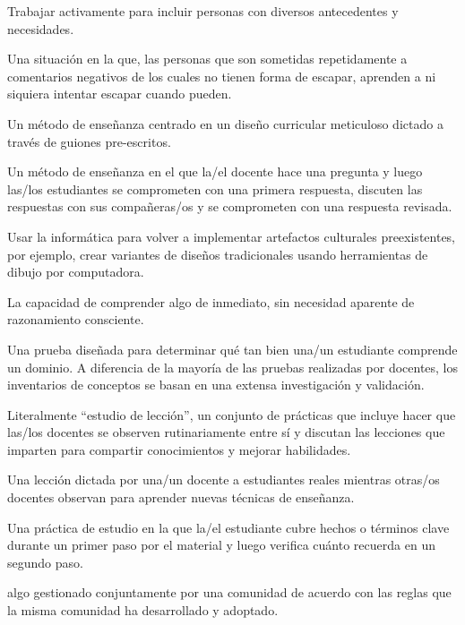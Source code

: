 \begin{description}
 Trabajar activamente para incluir
personas con diversos antecedentes y necesidades.

 Una situación en la que, las personas que son sometidas repetidamente a 
comentarios negativos de los cuales no tienen forma de escapar, aprenden a ni siquiera intentar escapar cuando pueden.

 Un método de enseñanza centrado
en un diseño curricular meticuloso dictado a través de guiones pre-escritos.

 Un método de enseñanza en el que la/el docente hace una pregunta y 
luego las/los estudiantes se comprometen con una primera respuesta, discuten las respuestas con sus compañeras/os y 
se comprometen con una respuesta revisada.

 Usar la informática
para volver a implementar artefactos culturales preexistentes, por ejemplo,
crear variantes de diseños tradicionales usando herramientas de dibujo por computadora.

 La capacidad de comprender algo de inmediato,
sin necesidad aparente de razonamiento consciente.

 Una prueba diseñada para determinar
qué tan bien una/un estudiante comprende un dominio. A diferencia de la mayoría de las pruebas realizadas por docentes,
los inventarios de conceptos se basan en una extensa investigación y validación.

 Literalmente ``estudio de lección'', un conjunto de prácticas que incluye hacer que 
las/los docentes se observen rutinariamente entre sí y discutan las lecciones que imparten para compartir conocimientos y 
mejorar habilidades.

 Una lección dictada por una/un docente a estudiantes reales
mientras otras/os docentes observan para aprender nuevas técnicas de enseñanza.

 Una práctica de estudio
en la que la/el estudiante cubre hechos o términos clave durante un primer paso por el material y 
luego verifica cuánto recuerda en un segundo paso.

 algo gestionado conjuntamente por una comunidad
de acuerdo con las reglas que la misma comunidad ha desarrollado y adoptado.


\end{description}
